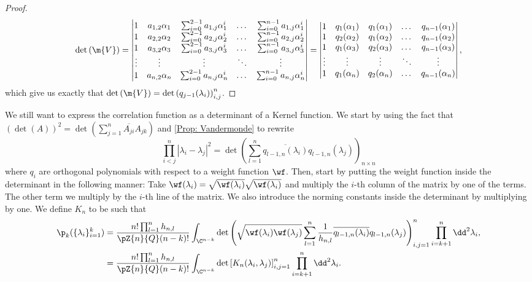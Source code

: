\begin{proof}
\begin{equation}
	\det\left(\m{V}\right) = 	\begin{vmatrix}
		1 & a_{1,2} \alpha_1 & \sum_{i=0}^{2-1} a_{1,j} \alpha_1^i & \dots &  \sum_{i=0}^{n-1} a_{1,j} \alpha_1^i \\
		1 & a_{2,2} \alpha_2 & \sum_{i=0}^{2-1} a_{2,j} \alpha_2^i & \dots & \sum_{i=0}^{n-1}a_{2,j} \alpha_2^i \\
		1 & a_{3,2} \alpha_3 & \sum_{i=0}^{2-1} a_{3,j} \alpha_3^i & \dots &\sum_{i=0}^{n-1}a_{3,j} \alpha_3^i\\
		\vdots & \vdots & \vdots & \ddots & \vdots \\
		1 & a_{n,2} \alpha_n & \sum_{i=0}^{2-1} a_{n,j} \alpha_n^i & \dots & \sum_{i=0}^{n-1}a_{n,j} \alpha_n^i
	\end{vmatrix} = 
		\begin{vmatrix}
		1 & q_1(\alpha_1) & q_{1}(\alpha_1) & \dots & q_{n-1}(\alpha_1) \\
		1 & q_2(\alpha_2) & q_{1}(\alpha_2) & \dots & q_{n-1}(\alpha_2) \\
		1 & q_1(\alpha_3) & q_2(\alpha_3) & \dots & q_{n-1}(\alpha_3) \\
		\vdots & \vdots & \vdots & \ddots & \vdots \\
		1 & q_1(\alpha_n) & q_2(\alpha_n) & \dots & q_{n-1}(\alpha_n)
	\end{vmatrix},
\end{equation}
which give us exactly that $\det\left(\m{V}\right) = {\det\left(q_{j-1}(\lambda_i)\right)}_{i,j}^n$.
\end{proof}

We still want to express the correlation function as a determinant of a Kernel function. We start by using the fact that $(\det(A))^2 = \det(\sum_{j=1}^{n} \overline{A_{ji}} A_{jk})$ and \autoref{Prop: Vandermonde} to rewrite
\begin{equation}
	\prod_{i<j}^{n} |\lambda_i - \lambda_j|^2 = {\det\left(\sum_{l=1}^{n} \overline{q_{l-1,n}(\lambda_i)} q_{l-1,n}(\lambda_j) \right)}_{n\times n}
\end{equation}
where $q_i$ are orthogonal polynomials with respect to a weight function $\wf$. Then, start by putting the weight function inside the determinant in the following manner: Take $\wf(\lambda_i) = \sqrt{\wf(\lambda_i)}\sqrt{\wf(\lambda_i)}$ and multiply the $i$-th column of the matrix by one of the terms. The other term we multiply by the $i$-th line of the matrix. We also introduce the norming constants inside the determinant by multiplying by one. We define $K_n$ to be such that
\begin{align}
	\p_k(\{\lambda_i\}_{i=1}^k) & = 
	\frac{n! \prod_{l=1}^n h_{n,l}}{\pZ{n}{Q}(n-k)!}	\int_{\C^{n-k}}  {\det\left(\sqrt{\wf(\lambda_i)\wf(\lambda_j)} \sum_{l=1}^{n} \frac{1}{h_{n,l}} \overline{q_{l-1,n}(\lambda_i)} q_{l-1,n}(\lambda_j) \right)}_{i,j=1}^{n} \prod_{i=k+1}^{n} \dd^2 \lambda_i, \\
	& = \frac{n! \prod_{l=1}^n h_{n,l}}{\pZ{n}{Q} (n-k)!}  \int_{\C^{n-k}} \det\left[ K_n(\lambda_i, \lambda_j) \right]_{i,j=1}^{n} \prod_{i=k+1}^{n} \dd^2 \lambda_i.
	\label{Equation: determinantal}
\end{align}

